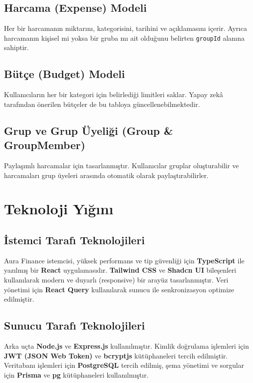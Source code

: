 \subsection{Harcama (Expense) Modeli}
Her bir harcamanın miktarını, kategorisini, tarihini ve açıklamasını içerir. Ayrıca harcamanın kişisel mi yoksa bir gruba mı ait olduğunu belirten \texttt{groupId} alanına sahiptir.

\subsection{Bütçe (Budget) Modeli}
Kullanıcıların her bir kategori için belirlediği limitleri saklar. Yapay zekâ tarafından önerilen bütçeler de bu tabloya güncellenebilmektedir.

\subsection{Grup ve Grup Üyeliği (Group \& GroupMember)}
Paylaşımlı harcamalar için tasarlanmıştır. Kullanıcılar gruplar oluşturabilir ve harcamaları grup üyeleri arasında otomatik olarak paylaştırabilirler.

\section{Teknoloji Yığını}

\subsection{İstemci Tarafı Teknolojileri}
Aura Finance istemcisi, yüksek performans ve tip güvenliği için \textbf{TypeScript} ile yazılmış bir \textbf{React} uygulamasıdır. \textbf{Tailwind CSS} ve \textbf{Shadcn UI} bileşenleri kullanılarak modern ve duyarlı (responsive) bir arayüz tasarlanmıştır. Veri yönetimi için \textbf{React Query} kullanılarak sunucu ile senkronizasyon optimize edilmiştir.

\subsection{Sunucu Tarafı Teknolojileri}
Arka uçta \textbf{Node.js} ve \textbf{Express.js} kullanılmıştır. Kimlik doğrulama işlemleri için \textbf{JWT (JSON Web Token)} ve \textbf{bcryptjs} kütüphaneleri tercih edilmiştir. Veritabanı işlemleri için \textbf{PostgreSQL} tercih edilmiş, şema yönetimi ve sorgular için \textbf{Prisma} ve \textbf{pg} kütüphaneleri kullanılmıştır.

